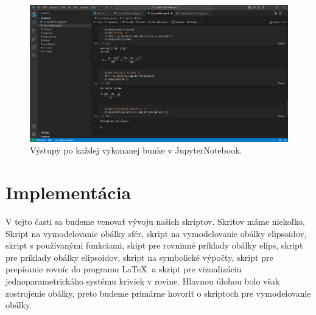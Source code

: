 \begin{figure}[h]
	\centering
	\includegraphics[width=\textwidth]{images/jupyter.png}
	\caption[Jupyter Notebook.]{Výstupy po každej vykonanej bunke v JupyterNotebook.}
	\label{fig:jupyter}
\end{figure}

\section{Implementácia}
V tejto časti sa budeme venovať vývoju našich skriptov. Skritov máme niekoľko. Skript na vymodelovanie obálky sfér, skript na vymodelovanie obálky elipsoidov, skript s používanými funkciami, skipt pre rovninné príklady obálky elíps, skript pre príklady obálky elipsoidov, skript na symbolické výpočty, skript pre prepísanie rovníc do programu \LaTeX $\ $ a skript pre vizualizáciu jednoparametrickáho systému kriviek v rovine. Hlavnou úlohou bolo však zostrojenie obálky, preto budeme primárne hovoriť o skriptoch pre vymodelovanie obálky.
